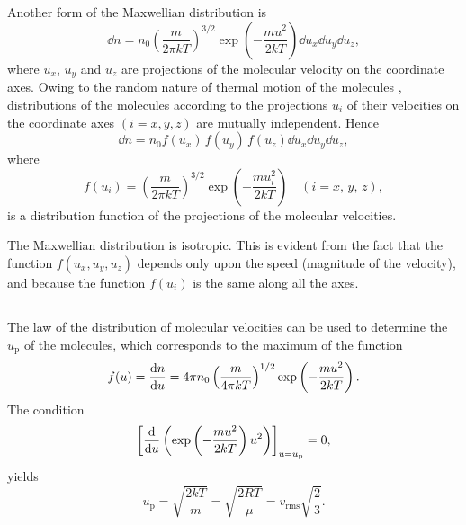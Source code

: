 \subsection{}\label{10.3.3} Another form of the Maxwellian distribution is
\begin{equation*}%
\dd n =n_{0} \left(\frac{m}{2 \pi k T}\right)^{3/2} \exp \left( - \frac{mu^{2}}{2kT}\right) \dd u_{x} \dd u_{y} \dd u_{z},
\end{equation*}
where $u_{x}$, $u_{y}$ and $u_{z}$ are projections of the molecular velocity on the coordinate axes. Owing to the random nature of thermal motion of the molecules , distributions of the molecules according to the projections $u_{i}$ of their velocities on the coor­dinate axes $(i = x, y, z)$ are mutually independent. Hence
\begin{equation*}%
\dd n= n_{0} f(u_{x}) \,f(u_{y}) \,f(u_{z}) \dd u_{x} \dd u_{y} \dd u_{z},
\end{equation*}
 where
\begin{equation*}%
f(u_{i}) = \left(\frac{m}{2 \pi k T}\right)^{3/2} \exp \left( - \frac{mu_{i}^{2}}{2kT}\right)\quad (i =x,\,y,\,z),
\end{equation*}
is a distribution function of the projections of the molecular velocities.

The Maxwellian distribution is isotropic. This is evident from the fact that the function $f(u_{x}, u_{y}, u_{z})$ depends only upon the speed (magnitude of the velocity), and because the function  $f(u_{i})$ is the same along all the axes.

\subsection{}\label{10.3.4} The law of the distribution of molecular velocities  can be used to determine the  $u_{\textrm{p}}$ of the molecules, which corresponds to the maximum of the function
\begin{equation*}%
f(u) = \dv{n}{u} = 4 \pi n_{0} \left( \frac{m}{4 \pi k T} \right)^{1/2} \exp \left(- \frac{mu^{2}}{2kT} \right).
\end{equation*}
The condition 
\begin{equation*}%
\left[ \dv{u} \left( \exp \left(- \frac{mu^{2}}{2kT} \right) u^{2} \right)
 \right]_{u=u_{\textrm{p}}} = 0,
\end{equation*}
yields
\begin{equation*}%
u_{\textrm{p}} = \sqrt{\frac{2kT}{m}}= \sqrt{\frac{2RT}{\mu}} = v_{\textrm{rms}} \sqrt{\frac{2}{3}}.
\end{equation*}

